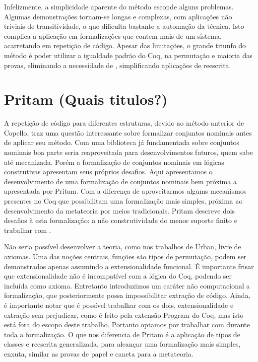 Infelizmente, a simplicidade aparente do método esconde alguns problemas. Algumas demonstrações tornam-se longas e complexas, com aplicações não triviais de transitividade, o que dificulta bastante a automação da técnica. Isto complica a aplicação em formalizações que contem mais de um sistema, acarretando em repetição de código. Apesar das limitações, o grande triunfo do método é poder utilizar a igualdade padrão do Coq, na permutação e maioria das provas, eliminando a necessidade de \setoids, simplificando aplicações de reescrita.

\section{Pritam (Quais titulos?)}\label{sec:choudhury}
A repetição de código para diferentes estruturas, devido ao método anterior de Copello, traz uma questão interessante sobre formalizar conjuntos nominais antes de aplicar seu método. Com uma biblioteca já fundamentada sobre conjuntos nominais boa parte seria reaproveitada para desenvolvimentos futuros, quem sabe até mecanizada. Porém a formalização de conjuntos nominais em lógicas construtivas apresentam seus próprios desafios. Aqui apresentamos o desenvolvimento de uma formalização de conjuntos nominais bem próxima a apresentada por Pritam. Com a diferença de aproveitarmos algums mecanismos presentes no Coq que possibilitam uma formalização mais simples, próxima ao desenvolvimento da metateoria por meios tradicionais. Pritam descreve dois desafios à esta formalização: a não construtividade do menor suporte finito e trabalhar com \setoids.

Não seria possível desenvolver a teoria, como nos trabalhos de Urban, livre de axiomas. Uma das noções centrais, funções são tipos de permutação, podem ser demonstrados apenas assumindo a extensionalidade funcional. É importante frisar que extensionalidade não é incompatível com a lógica do Coq, podendo ser incluída como axioma. Entretanto introduzimos um caráter não computacional a formalização, que posteriormente possa impossibilitar extração de código. Ainda, é importante notar que é possível trabalhar com os dois, extensionalidade e extração sem prejudicar, como é feito pela extensão Program do Coq, mas isto está fora do escopo deste trabalho. Portanto optamos por trabalhar com \setoids durante toda a formalização. O que nos diferencia de Pritam é a aplicação de tipos de classes e reescrita generalizada, para alcançar uma formalização mais simples, enxuta, similar as provas de papel e caneta para a metateoria.

